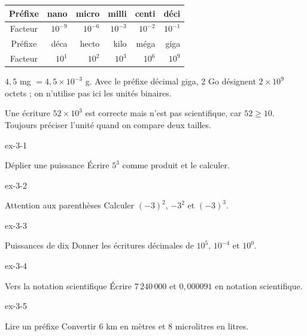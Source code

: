 \begin{center}\begin{tabular}{c|rrrrr}\toprule
Préfixe & nano & micro & milli & centi & déci\\\midrule
Facteur & $10^{-9}$ & $10^{-6}$ & $10^{-3}$ & $10^{-2}$ & $10^{-1}$\\\midrule
Préfixe & déca & hecto & kilo & méga & giga\\\midrule
Facteur & $10^1$ & $10^2$ & $10^3$ & $10^6$ & $10^9$\\\bottomrule
\end{tabular}\end{center}
\begin{exemple}$4{,}5$ mg $=4{,}5\times10^{-3}$ g. Avec le préfixe décimal giga, 2 Go désignent $2\times10^9$ octets ; on n’utilise pas ici les unités binaires.\end{exemple}
\begin{attention}Une écriture $52\times10^3$ est correcte mais n’est pas scientifique, car $52\ge10$. Toujours préciser l’unité quand on compare deux tailles.\end{attention}

\clearpage{}
\begin{blocLivre}{ex-3-1}\begin{exercice}[1]{Déplier une puissance}
Écrire $5^3$ comme produit et le calculer.
\end{exercice}\end{blocLivre}
\begin{blocLivre}{ex-3-2}\begin{exercice}[1]{Attention aux parenthèses}
Calculer $(-3)^2$, $-3^2$ et $(-3)^3$.
\end{exercice}\end{blocLivre}
\begin{blocLivre}{ex-3-3}\begin{exercice}[1]{Puissances de dix}
Donner les écritures décimales de $10^5$, $10^{-4}$ et $10^0$.
\end{exercice}\end{blocLivre}
\begin{blocLivre}{ex-3-4}\begin{exercice}[1]{Vers la notation scientifique}
Écrire $7\,240\,000$ et $0{,}000091$ en notation scientifique.
\end{exercice}\end{blocLivre}
\begin{blocLivre}{ex-3-5}\begin{exercice}[1]{Lire un préfixe}
Convertir 6 km en mètres et 8 microlitres en litres.
\end{exercice}\end{blocLivre}

